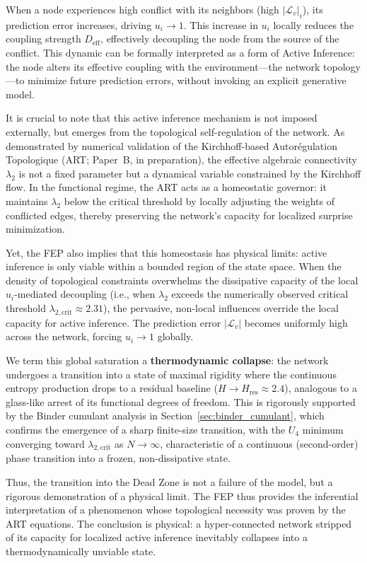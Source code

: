 \documentclass[11pt]{article}
\begin{document}
When a node experiences high conflict with its neighbors (high $|\mathcal{L}_v|_i$), its prediction error increases, driving $u_i \to 1$. This increase in $u_i$ locally reduces the coupling strength $D_{\text{eff}}$, effectively decoupling the node from the source of the conflict. This dynamic can be formally interpreted as a form of Active Inference: the node alters its effective coupling with the environment---the network topology---to minimize future prediction errors, without invoking an explicit generative model.

It is crucial to note that this active inference mechanism is not imposed externally, but emerges from the topological self-regulation of the network. As demonstrated by numerical validation of the Kirchhoff-based Autorégulation Topologique (ART; Paper~B, in preparation), the effective algebraic connectivity $\lambda_2$ is not a fixed parameter but a dynamical variable constrained by the Kirchhoff flow. In the functional regime, the ART acts as a homeostatic governor: it maintains $\lambda_2$ below the critical threshold by locally adjusting the weights of conflicted edges, thereby preserving the network's capacity for localized surprise minimization.

Yet, the FEP also implies that this homeostasis has physical limits: active inference is only viable within a bounded region of the state space. When the density of topological constraints overwhelms the dissipative capacity of the local $u_i$-mediated decoupling (i.e., when $\lambda_2$ exceeds the numerically observed critical threshold $\lambda_{2,\text{crit}} \approx 2.31$), the pervasive, non-local influences override the local capacity for active inference. The prediction error $|\mathcal{L}_v|$ becomes uniformly high across the network, forcing $u_i \to 1$ globally.

We term this global saturation a \textbf{thermodynamic collapse}: the network undergoes a transition into a state of maximal rigidity where the continuous entropy production drops to a residual baseline ($H \to H_{\text{res}} \approx 2.4$), analogous to a glass-like arrest of its functional degrees of freedom. This is rigorously supported by the Binder cumulant analysis in Section~\ref{sec:binder_cumulant}, which confirms the emergence of a sharp finite-size transition, with the $U_4$ minimum converging toward $\lambda_{2,\text{crit}}$ as $N \to \infty$, characteristic of a continuous (second-order) phase transition into a frozen, non-dissipative state.

Thus, the transition into the Dead Zone is not a failure of the model, but a rigorous demonstration of a physical limit. The FEP thus provides the inferential interpretation of a phenomenon whose topological necessity was proven by the ART equations. The conclusion is physical: a hyper-connected network stripped of its capacity for localized active inference inevitably collapses into a thermodynamically unviable state.
\end{document}

